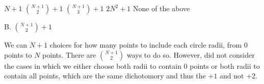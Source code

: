 \documentclass[answers]{exam}
\begin{document}
\begin{questions}
\begin{choices}
    \choice $N + 1$
    \choice $\binom{N+1}{2} + 1$
    \choice $\binom{N+1}{3} + 1$
    \choice $2N^2 + 1$
    \choice None of the above
\end{choices}

\begin{solution}
B. $\binom{N+1}{2} + 1$

We can $N+1$ choices for how many points to include each circle radii, from
0 points to $N$ points. There are $\binom{N+1}{2}$ ways to do so. However,
did not consider the cases in which we either choose both radii to contain 0
points or both radii to contain all points, which are the same dichotomory and
thus the $+1$ and not $+2$.
\end{solution}

\end{questions}
\end{document}
